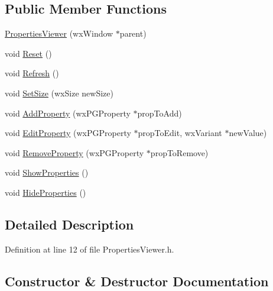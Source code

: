\subsection*{Public Member Functions}
\begin{DoxyCompactItemize}
\item 
\hyperlink{class_properties_viewer_ac27fb4a7b2c7d97ce25a22944e8f2090}{Properties\+Viewer} (wx\+Window $\ast$parent)
\item 
void \hyperlink{class_properties_viewer_a610dc708815ecdc748c2898551f086c0}{Reset} ()
\item 
void \hyperlink{class_properties_viewer_aac1a5924495246147e465375a686d938}{Refresh} ()
\item 
void \hyperlink{class_properties_viewer_a584378c78158525069fccc64ba446821}{Set\+Size} (wx\+Size new\+Size)
\item 
void \hyperlink{class_properties_viewer_ae8fe6d69893153aa755656e9db880bfd}{Add\+Property} (wx\+P\+G\+Property $\ast$prop\+To\+Add)
\item 
void \hyperlink{class_properties_viewer_ac726c244cf706ab9de1b2c3c6e55af2d}{Edit\+Property} (wx\+P\+G\+Property $\ast$prop\+To\+Edit, wx\+Variant $\ast$new\+Value)
\item 
void \hyperlink{class_properties_viewer_a17827ffbcf53b5dc5cd2d0873d2bf2e7}{Remove\+Property} (wx\+P\+G\+Property $\ast$prop\+To\+Remove)
\item 
void \hyperlink{class_properties_viewer_a728c21d8325941bfcee2599ea9edd9bc}{Show\+Properties} ()
\item 
void \hyperlink{class_properties_viewer_aa8b18eb764e97888751e5c5ef0bd207f}{Hide\+Properties} ()
\end{DoxyCompactItemize}


\subsection{Detailed Description}


Definition at line 12 of file Properties\+Viewer.\+h.



\subsection{Constructor \& Destructor Documentation}
\mbox{\label{class_properties_viewer_ac27fb4a7b2c7d97ce25a22944e8f2090}} 
